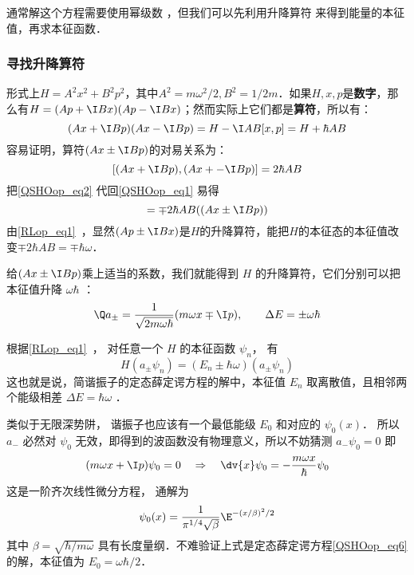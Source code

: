 通常解这个方程需要使用幂级数%
，但我们可以先利用升降算符 来得到能量的本征值，再求本征函数．


\subsubsection{寻找升降算符}

形式上$H=A^2x^2+B^2p^2$，其中$A^2=m\omega^2/2, B^2=1/2m$．如果$H, x, p$是\textbf{数字}，那么有$H = (Ap+\I Bx)(Ap-\I Bx)$；然而实际上它们都是\textbf{算符}，所以有：
\begin{equation}\label{QSHOop_eq1}
(Ax+\I Bp)(Ax-\I Bp) = H-\I AB[x, p] = H+\hbar AB
\end{equation}
容易证明，算符$(Ax\pm\I Bp)$的对易关系为：
\begin{equation}\label{QSHOop_eq2}
[(Ax+\I Bp), (Ax+-\I Bp)] = 2\hbar AB
\end{equation}
把\autoref{QSHOop_eq2} 代回\autoref{QSHOop_eq1} 易得
\begin{equation}
[H, (Ax\pm\I Bp) = [H+ \hbar AB, (Ax\pm\I Bp)] = \mp 2\hbar AB ((Ax\pm\I Bp))
\end{equation}
由\autoref{RLop_eq1}~，显然$(Ap\pm \I Bx)$是$H$的升降算符，能把$H$的本征态的本征值改变$\mp 2\hbar AB=\mp \hbar \omega$．

给$(Ax\pm\I Bp)$乘上适当的系数，我们就能得到 $H$ 的升降算符，它们分别可以把本征值升降 $\omega\hbar$ ：
\begin{equation}
\Q a_\pm = \frac{1}{\sqrt{2m\omega\hbar}} (m\omega x \mp \I p), 
\qquad
\Delta E = \pm \omega \hbar
\end{equation}

根据\autoref{RLop_eq1}~， 对任意一个 $H$ 的本征函数 $\psi_n$， 有
\begin{equation}
H(a_\pm\psi_n) = (E_n\pm\hbar\omega) (a_ \pm \psi_n)
\end{equation}
这也就是说，简谐振子的定态薛定谔方程的解中，本征值 $E_n$ 取离散值，且相邻两个能级相差 $\Delta E = \hbar \omega$ ．

类似于无限深势阱， 谐振子也应该有一个最低能级 $E_0$ 和对应的 $\psi_0(x)$． 所以 $a_-$ 必然对 $\psi_0$ 无效，即得到的波函数没有物理意义，所以不妨猜测 $a_- \psi_0 = 0$ 
即
\begin{equation}
(m\omega x + \I p)\psi_0 = 0
\quad \Rightarrow \quad
\dv{x} \psi_0 =  - \frac{m\omega x}{\hbar } \psi_0
\end{equation}
这是一阶齐次线性微分方程，%
通解为
\begin{equation}
\psi_0(x) = \frac{1}{\pi^{1/4}\sqrt\beta} \E^{-(x/\beta)^2/2}
\end{equation}
其中 $\beta = \sqrt{\hbar /m\omega}$ 具有长度量纲．不难验证上式是定态薛定谔方程\autoref{QSHOop_eq6} 的解，本征值为 $E_0=\omega\hbar/2$．


